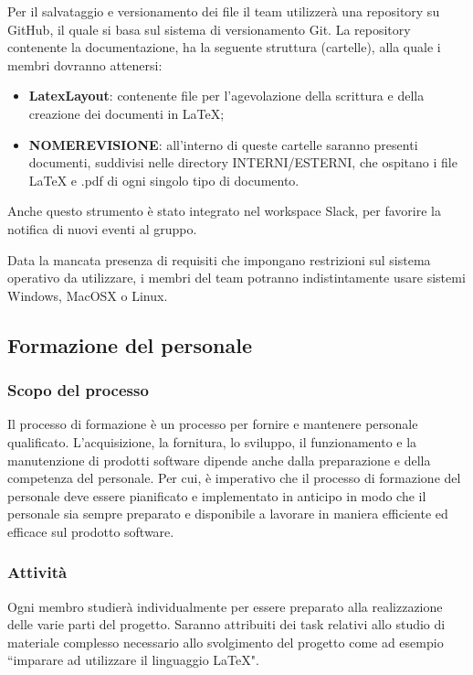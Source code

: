             Per il salvataggio e versionamento dei file il team utilizzerà una repository su GitHub, il quale
            si basa sul sistema di versionamento Git.
            La repository contenente la documentazione, ha la seguente struttura (cartelle), alla quale i membri dovranno attenersi:

                \begin{itemize}
                    \item \textbf{LatexLayout}: contenente file per l'agevolazione della scrittura e della creazione
                    dei documenti in \LaTeX{};
                    \item \textbf{NOMEREVISIONE}: all'interno di queste cartelle saranno presenti documenti,
                    suddivisi nelle directory INTERNI/ESTERNI, che ospitano i file \LaTeX{} e .pdf di ogni singolo tipo di documento.
                \end{itemize}

            Anche questo strumento è stato integrato nel workspace Slack, per favorire la notifica di nuovi eventi al gruppo.


			Data la mancata presenza di requisiti che impongano restrizioni sul sistema operativo da utilizzare,
			i membri del team potranno indistintamente usare sistemi Windows, MacOSX o Linux.

	\newpage

    \subsection{Formazione del personale}
    
    		\subsubsection{Scopo del processo}

		Il processo di formazione è un processo per fornire e mantenere personale qualificato. L'acquisizione, la fornitura,
		lo sviluppo, il funzionamento e la manutenzione di prodotti software dipende anche dalla preparazione e della
		competenza del personale. Per cui, è imperativo che il processo di formazione del personale deve essere pianificato e
		implementato in anticipo in modo che il personale sia sempre preparato e disponibile a lavorare in maniera efficiente
		ed efficace sul prodotto software.

		\subsubsection{Attività}

        Ogni membro studierà individualmente per essere preparato alla realizzazione delle varie parti del progetto.
        Saranno attribuiti dei task relativi allo studio di materiale complesso necessario allo svolgimento del progetto
        come ad esempio ``imparare ad utilizzare il linguaggio \LaTeX{}".